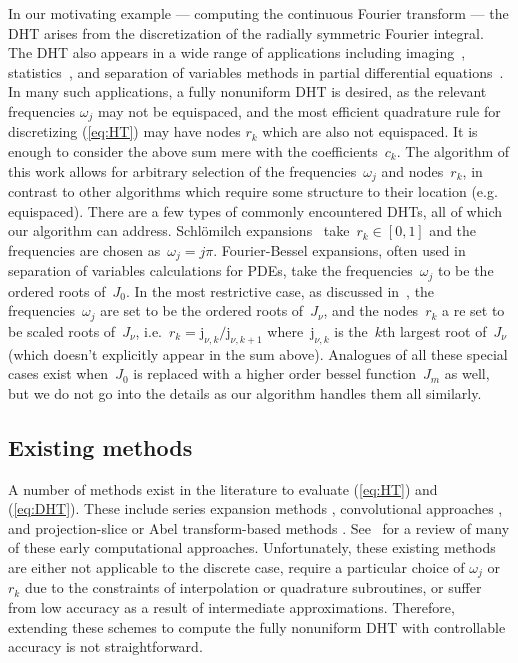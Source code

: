 In our motivating example --- computing the continuous Fourier transform --- the
DHT arises from the discretization of the radially symmetric Fourier integral.
The DHT also appears in a wide range of applications including
imaging~\cite{higgins1988hankel, zhao2013fourier}, statistics~\cite{lord1954a,
genton2002nonparametric}, and separation of variables methods in partial
differential equations~\cite{bisseling1985fast,ali1999generalized}. In many such
applications, a fully nonuniform DHT is desired, as the relevant frequencies
$\omega_j$ may not be equispaced, and the most efficient quadrature rule for
discretizing (\ref{eq:HT}) may have nodes $r_k$ which are also not equispaced.
It is enough to consider the above sum mere with the coefficients~$c_k$. The
algorithm of this work allows for arbitrary selection of the
frequencies~$\omega_j$ and nodes~$r_k$, in contrast to other algorithms which
require some structure to their location (e.g. equispaced). There are a few
types of commonly encountered DHTs, all of which our algorithm can address.
Schl\"omilch expansions~\cite{} take~$r_k \in [0,1]$ and the frequencies are
chosen as~$\omega_j = j\pi$. Fourier-Bessel expansions, often used in separation
of variables calculations for PDEs, take the frequencies~$\omega_j$ to be the
ordered roots of~$J_0$. In the most restrictive case, as discussed
in~\cite{johnson1987}, the frequencies~$\omega_j$ are set to be the ordered
roots of~$J_\nu$, and the nodes~$r_k$ a re set to be scaled roots of~$J_\nu$,
i.e.~$r_k = \mathrm{j}_{\nu,k}/\mathrm{j}_{\nu,k+1}$ where~$\mathrm{j}_{\nu,k}$
is the~$k$th largest root of~$J_\nu$ (which doesn't explicitly appear in the sum
above). Analogues of all these special cases exist when~$J_0$ is replaced with a
higher order bessel function~$J_m$ as well, but we do not go into the details as
our algorithm handles them all similarly.

\subsection*{Existing methods}
\label{sec:existing}

A number of methods exist in the literature to evaluate (\ref{eq:HT}) and
(\ref{eq:DHT}). These include series expansion methods
\cite{lord1954b,brunol1977fourier,cavanagh1979numerical}, convolutional
approaches \cite{siegman1977quasi, johansen1979fast, mook1983algorithm,
liu1999nonuniform}, and projection-slice or Abel transform-based methods
\cite{oppenheim1980computation, hansen1985fast, kapur1995algorithm}.
See~\cite{cree1993algorithms} for a review of many of these early computational
approaches. Unfortunately, these existing methods are either not applicable to
the discrete case, require a particular choice of $\omega_j$ or $r_k$ due to the
constraints of interpolation or quadrature subroutines, or suffer from low
accuracy as a result of intermediate approximations. Therefore, extending these
schemes to compute the fully nonuniform DHT with controllable accuracy is not
straightforward.

